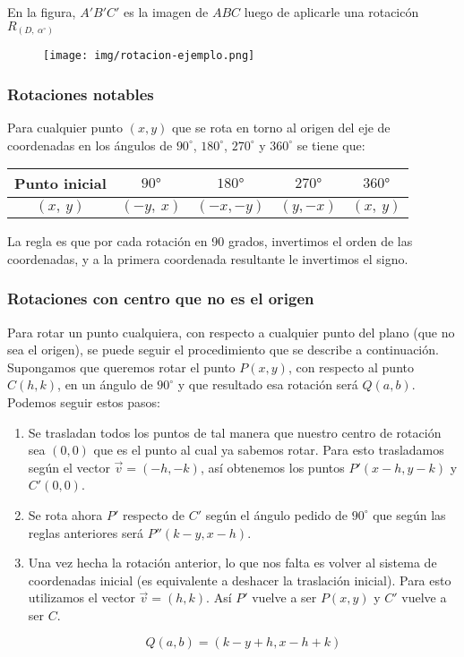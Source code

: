 En la figura, $A'B'C'$ es la imagen de $ABC$ luego de aplicarle una rotacicón $R_{(D,~\alpha ^\circ)}$

\begin{figure}[hbt!]
	\centering
	\texttt{[image: img/rotacion-ejemplo.png]}
\end{figure}
\newpage
\subsubsection{Rotaciones notables}

Para cualquier punto $(x,y)$ que se rota en torno al origen del eje de coordenadas en los ángulos de $90^\circ$, $180^\circ$, $270^\circ$ y $360^\circ$ se tiene que:

\begin{center}
	\begin{tabular}{|c|c|c|c|c|}\hline
		\textbf{Punto inicial} & \textbf{$90\text{°}$} & \textbf{$180\text{°}$} & \textbf{$270\text{°}$} & \textbf{$360\text{°}$} \\ \hline
		$(x,~y)$ & $(-y,~x)$ & $(-x,-y)$ & $(y,-x)$ & $(x,~y)$ \\ \hline
	\end{tabular}
\end{center}

La regla es que por cada rotación en 90 grados, invertimos el orden de las coordenadas, y a la primera coordenada resultante le invertimos el signo.

\subsubsection{Rotaciones con centro que no es el origen}
Para rotar un punto cualquiera, con respecto a cualquier punto del plano (que no sea el origen), se puede seguir el procedimiento que se describe a continuación.\\

Supongamos que queremos rotar el punto $P(x,y)$, con respecto al punto $C(h,k)$, en un ángulo de $90^\circ$ y que resultado esa rotación será $Q(a,b)$. Podemos seguir estos pasos:

\begin{enumerate}
	\item Se trasladan todos los puntos de tal manera que nuestro centro de rotación sea $(0,0)$ que es el punto al cual ya sabemos rotar. Para esto trasladamos según el vector $\vec{v} = (-h, -k)$, así obtenemos los puntos $P'(x-h, y-k)$ y $C'(0,0)$.
	
	\item Se rota ahora $P'$ respecto de $C'$ según el ángulo pedido de $90^\circ$ que según las reglas anteriores será $P''(k-y, x-h)$.
	
	\item Una vez hecha la rotación anterior, lo que nos falta es volver al sistema de coordenadas inicial (es equivalente a deshacer la traslación inicial). Para esto utilizamos el vector $\vec{v} = (h,k)$. Así $P'$ vuelve a ser $P(x,y)$ y $C'$ vuelve a ser $C$.
	
	\[Q(a,b) = (k-y+h, x-h+k)\]
	
\end{enumerate}